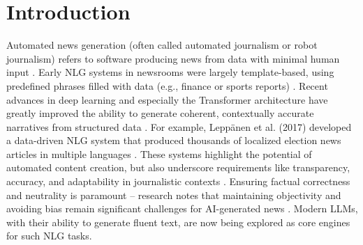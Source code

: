 \section*{Introduction}

Automated news generation (often called automated journalism or robot journalism) refers to software producing news from data with minimal human input \cite{acl_anthology}.
Early NLG systems in newsrooms were largely template-based, using predefined phrases filled with data (e.g., finance or sports reports) \cite{acl_anthology}.
Recent advances in deep learning and especially the Transformer architecture have greatly improved the ability to generate coherent, contextually accurate narratives from structured data \cite{arxiv_transformer}.
For example, Leppänen et al. (2017) developed a data-driven NLG system that produced thousands of localized election news articles in multiple languages \cite{acl_anthology}.
These systems highlight the potential of automated content creation, but also underscore requirements like transparency, accuracy, and adaptability in journalistic contexts \cite{acl_anthology}.
Ensuring factual correctness and neutrality is paramount – research notes that maintaining objectivity and avoiding bias remain significant challenges for AI-generated news \cite{arxiv_bias}.
Modern LLMs, with their ability to generate fluent text, are now being explored as core engines for such NLG tasks.
